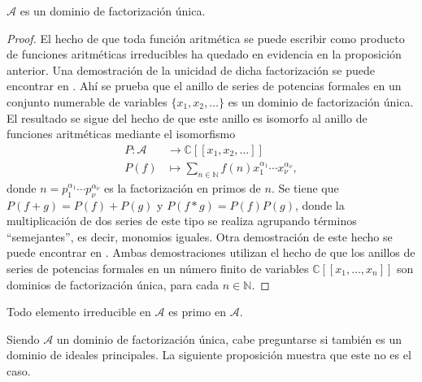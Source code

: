 \begin{theorem}
$\mathcal{A}$ es un dominio de factorización única.
\end{theorem}
\begin{proof}
El hecho de que toda función aritmética se puede escribir como producto de funciones aritméticas irreducibles ha quedado en evidencia en la proposición anterior. Una demostración de la unicidad de dicha factorización se puede encontrar en \cite[18, p. 985]{Ca1959}. Ahí se prueba que el anillo de series de potencias formales en un conjunto numerable de variables $\{ x_1,x_2,\ldots \}$ es un dominio de factorización única. El resultado se sigue del hecho de que este anillo es isomorfo al anillo de funciones aritméticas mediante el isomorfismo
\begin{align*}
    P : \mathcal{A} & \longrightarrow \mathbb{C}[[x_1,x_2,\ldots]] \\
    P(f) & \longmapsto \sum_{n \in \mathbb{N}} f(n) x_1^{\alpha_1}\cdots x_{\nu}^{\alpha_{\nu}},
\end{align*}
donde $n=p_1^{\alpha_1}\cdots p_{\nu}^{\alpha_{\nu}}$ es la factorización en primos de $n$. Se tiene que $P(f+g)=P(f)+P(g)$ y $P(f*g)=P(f)P(g)$, donde la multiplicación de dos series de este tipo se realiza agrupando términos ``semejantes'', es decir, monomios iguales. Otra demostración de este hecho se puede encontrar en \cite{Nish1}. Ambas demostraciones utilizan el hecho de que los anillos de series de potencias formales en un número finito de variables $\mathbb{C}[[x_1,\ldots,x_n]]$ son dominios de factorización única, para cada $n \in \mathbb{N}$.
\end{proof}

\begin{corollary}\label{cor:fac1}
Todo elemento irreducible en $\mathcal{A}$ es primo en $\mathcal{A}$.
\end{corollary}

Siendo $\mathcal{A}$ un dominio de factorización única, cabe preguntarse si también es un dominio de ideales principales. La siguiente proposición muestra que este no es el caso.

